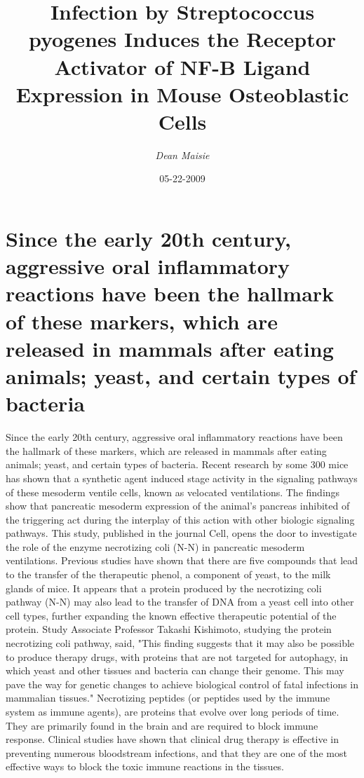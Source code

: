 \documentclass{article}%
\title{Infection by Streptococcus pyogenes Induces the Receptor Activator of  NF{-}B Ligand Expression in Mouse Osteoblastic Cells}%
\author{\textit{Dean Maisie}}%
\date{05-22-2009}%
\begin{document}
%
\normalsize%
\maketitle%
\section{Since the early 20th century, aggressive oral inflammatory reactions have been the hallmark of these markers, which are released in mammals after eating animals; yeast, and certain types of bacteria}%
\label{sec:Sincetheearly20thcentury,aggressiveoralinflammatoryreactionshavebeenthehallmarkofthesemarkers,whicharereleasedinmammalsaftereatinganimalsyeast,andcertaintypesofbacteria}%
Since the early 20th century, aggressive oral inflammatory reactions have been the hallmark of these markers, which are released in mammals after eating animals; yeast, and certain types of bacteria.\newline%
Recent research by some 300 mice has shown that a synthetic agent induced stage activity in the signaling pathways of these mesoderm ventile cells, known as velocated ventilations. The findings show that pancreatic mesoderm expression of the animal's pancreas inhibited of the triggering act during the interplay of this action with other biologic signaling pathways.\newline%
This study, published in the journal Cell, opens the door to investigate the role of the enzyme necrotizing coli (N{-}N) in pancreatic mesoderm ventilations. Previous studies have shown that there are five compounds that lead to the transfer of the therapeutic phenol, a component of yeast, to the milk glands of mice. It appears that a protein produced by the necrotizing coli pathway (N{-}N) may also lead to the transfer of DNA from a yeast cell into other cell types, further expanding the known effective therapeutic potential of the protein.\newline%
Study Associate Professor Takashi Kishimoto, studying the protein necrotizing coli pathway, said, "This finding suggests that it may also be possible to produce therapy drugs, with proteins that are not targeted for autophagy, in which yeast and other tissues and bacteria can change their genome. This may pave the way for genetic changes to achieve biological control of fatal infections in mammalian tissues."\newline%
Necrotizing peptides (or peptides used by the immune system as immune agents), are proteins that evolve over long periods of time. They are primarily found in the brain and are required to block immune response. Clinical studies have shown that clinical drug therapy is effective in preventing numerous bloodstream infections, and that they are one of the most effective ways to block the toxic immune reactions in the tissues.\newline%
\end{document}
